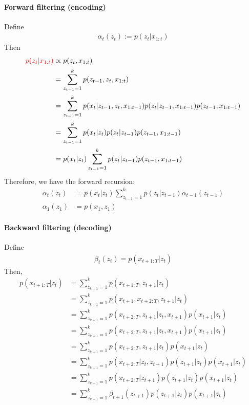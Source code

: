 \documentclass{article}
\begin{document}
	\paragraph{Forward filtering (encoding)}
	Define
	\begin{align}
		\alpha_t(z_t) := p(z_t|x_{1:t})
	\end{align}
	Then
	\begin{align}
		\textcolor{red}{p(z_t | x_{1:t})}
		&\propto p(z_t, x_{1:t}) \\
		&= \sum_{z_{t-1}=1}^k p(z_{t-1}, z_t, x_{1:t}) \\
		&= \sum_{z_{t-1}=1}^k p(x_t|z_{t-1}, z_t, x_{1:t-1}) p(z_t | z_{t-1}, x_{1:t-1}) p(z_{t-1}, x_{1:t-1}) \\
		&= \sum_{z_{t-1}=1}^k p(x_t|z_t) p(z_t | z_{t-1}) p(z_{t-1}, x_{1:t-1}) \\
		&= p(x_t|z_t) \sum_{z_{t-1}=1}^k p(z_t | z_{t-1}) p(z_{t-1}, x_{1:t-1}) \\
	\end{align}
	Therefore, we have the forward recursion:
	\begin{align}
		\alpha_t(z_t) &= p(x_t|z_t) \sum_{z_{t-1}=1}^k p(z_t | z_{t-1}) \alpha_{t-1}(z_{t-1}) \\
		\alpha_1(z_1) &= p(x_1, z_1)
	\end{align}
	
	\paragraph{Backward filtering (decoding)}
	Define
	\begin{align}
		\beta_t(z_t) = p(x_{t+1:T}|z_t)
	\end{align}
	Then,
	\begin{align}
		p(x_{t+1:T}|z_t)
		&= \sum_{z_{k+1}=1}^k p(x_{t+1:T}, z_{t+1}|z_t) \\
		&= \sum_{z_{k+1}=1}^k p(x_{t+1}, x_{t+2:T}, z_{t+1}|z_t) \\
		&= \sum_{z_{k+1}=1}^k p(x_{t+2:T}, z_{t+1}|z_t, x_{t+1}) p(x_{t+1}|z_t) \\
		&= \sum_{z_{k+1}=1}^k p(x_{t+2:T}, z_{t+1}|z_t, x_{t+1}) p(x_{t+1}|z_t) \\
		&= \sum_{z_{k+1}=1}^k p(x_{t+2:T}, z_{t+1}|z_t) p(x_{t+1}|z_t) \\
		&= \sum_{z_{k+1}=1}^k p(x_{t+2:T}|z_t, z_{t+1}) p(z_{t+1}|z_t) p(x_{t+1}|z_t) \\
		&= \sum_{z_{k+1}=1}^k p(x_{t+2:T}|z_{t+1}) p(z_{t+1}|z_t) p(x_{t+1}|z_t) \\
		&= \sum_{z_{k+1}=1}^k \beta_{t+1}(z_{t+1}) p(z_{t+1}|z_t) p(x_{t+1}|z_t)
	\end{align}
\end{document}
